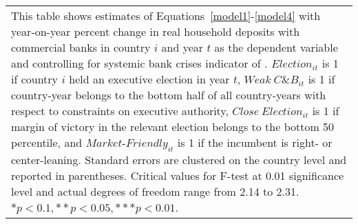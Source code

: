 \begin{longtable}{m{5cm}*{12}{c}}
\bottomrule                                          \multicolumn{13}{m{\linewidth}}{\footnotesize This table shows estimates of Equations~\eqref{model1}-\eqref{model4} with year-on-year percent change in real household deposits with commercial banks in country $ i $ and year $ t $ as the dependent variable and controlling for systemic bank crises indicator of \citet{laeven2012systemic}. $ Election_{it} $ is 1 if country $ i $ held an executive election in year $ t $, $ Weak\ C\&B_{it} $ is 1 if country-year belongs to the bottom half of all country-years with respect to constraints on executive authority, $ Close\ Election_{it} $ is 1 if margin of victory in the relevant election belongs to the bottom 50 percentile, and $ Market\text{-}Friendly_{it} $ is 1 if the incumbent is right- or center-leaning. Standard errors are clustered on the country level and reported in parentheses. Critical values for F-test at 0.01 significance level and actual degrees of freedom range from 2.14 to 2.31. \( * p<0.1, ** p<0.05, *** p<0.01 \). }\\                                          \end{longtable}
